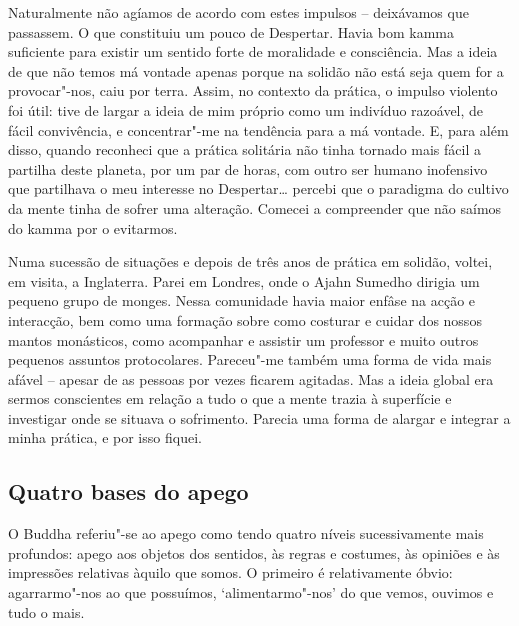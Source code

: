 Naturalmente não agíamos de acordo com estes impulsos -- deixávamos que
passassem. O que constituiu um pouco de Despertar. Havia bom kamma suficiente
para existir um sentido forte de moralidade e consciência. Mas a ideia de que
não temos má vontade apenas porque na solidão não está seja quem for a
provocar"-nos, caiu por terra. Assim, no contexto da prática, o impulso violento
foi útil: tive de largar a ideia de mim próprio como um indivíduo razoável, de
fácil convivência, e concentrar"-me na tendência para a má vontade. E, para além
disso, quando reconheci que a prática solitária não tinha tornado mais fácil a
partilha deste planeta, por um par de horas, com outro ser humano inofensivo que
partilhava o meu interesse no Despertar\ldots{} percebi que o paradigma do
cultivo da mente tinha de sofrer uma alteração. Comecei a compreender que não
saímos do kamma por o evitarmos.

Numa sucessão de situações e depois de três anos de prática em solidão, voltei,
em visita, a Inglaterra. Parei em Londres, onde o Ajahn Sumedho dirigia um
pequeno grupo de monges. Nessa comunidade havia maior enfâse na acção e
interacção, bem como uma formação sobre como costurar e cuidar dos nossos mantos
monásticos, como acompanhar e assistir um professor e muito outros pequenos
assuntos protocolares. Pareceu"-me também uma forma de vida mais afável --
apesar de as pessoas por vezes ficarem agitadas. Mas a ideia global era sermos
conscientes em relação a tudo o que a mente trazia à superfície e investigar
onde se situava o sofrimento. Parecia uma forma de alargar e integrar a minha
prática, e por isso fiquei.

\subsection{Quatro bases do apego}

O Buddha referiu"-se ao apego como tendo quatro níveis sucessivamente mais
profundos: apego aos objetos dos sentidos, às regras e costumes, às opiniões e
às impressões relativas àquilo que somos.
O primeiro é relativamente óbvio: agarrarmo"-nos ao que possuímos,
`alimentarmo"-nos' do que vemos, ouvimos e tudo o mais. 

